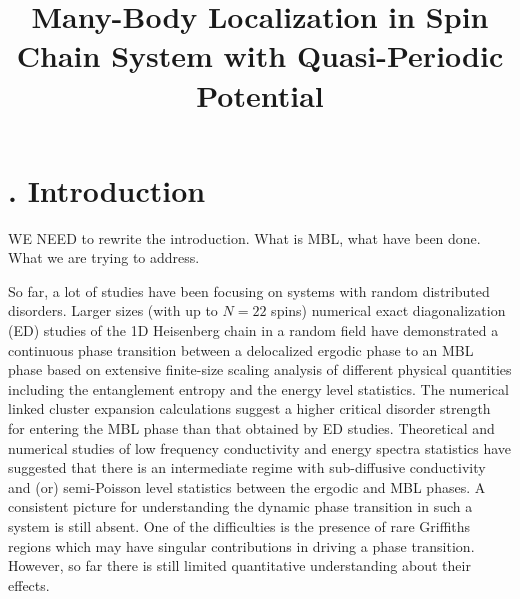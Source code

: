 \documentclass[prl,aps,epsf,showpacs,twocolumn]{revtex4}
\let\oldsection\section
\renewcommand{\section}[1]{\stepcounter{section}\oldsection{\Roman{section}. #1}}
\begin{document}
\title{Many-Body Localization in Spin Chain System with Quasi-Periodic Potential}
\author{} 


\begin{abstract} 


\end{abstract}

\maketitle


\section{Introduction}

WE NEED to rewrite  the introduction.   What is MBL,   what have been done.    What we are trying to address.





So far,   a lot of studies have been focusing on systems with random distributed disorders.  
Larger sizes (with up to $N=22$ spins) numerical  exact diagonalization (ED) studies\cite{luitz2015}  of
the 1D Heisenberg chain in a random field have  demonstrated a continuous  phase transition 
between a delocalized ergodic  phase  to an MBL  phase based on extensive finite-size scaling analysis
of different physical quantities including the  entanglement entropy  and  the energy level statistics.
The numerical linked cluster expansion calculations suggest a higher critical disorder strength  for entering the MBL phase\cite{devakul2015} 
  than that obtained by ED studies\cite{luitz2015}. 
Theoretical\cite{vosk_theory2014}  and numerical  studies of low frequency conductivity\cite{agarwal2015, knap2015} and 
energy spectra statistics\cite{serbyn2015} have suggested that there is an intermediate regime  with sub-diffusive conductivity
and (or)  semi-Poisson level statistics  between the ergodic and MBL phases.
A consistent picture for understanding the dynamic  phase transition in such a system is still absent.
One of the  difficulties  is the presence of  rare Griffiths regions\cite{vosk_theory2014, potter2015trans, knap2015}
which may have  singular contributions in  driving a  phase transition. However, so far there is
still limited  quantitative understanding about  their effects.
\end{document}
